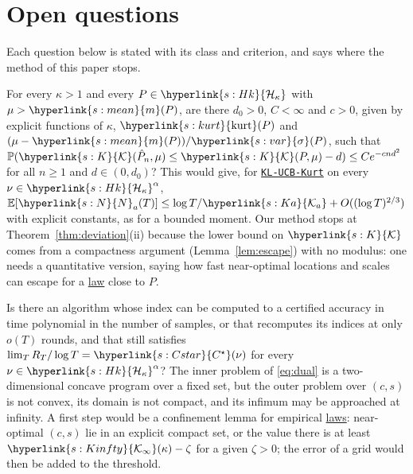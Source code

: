 \documentclass[11pt]{article}
\newcommand{\E}{\mathbb{E}}
\newcommand{\Prob}{\mathbb{P}}
\newcommand{\sy}[2]{{\hyperlink{#1}{#2}}}
\newcommand{\term}[2]{\hyperlink{#1}{#2}}
\newcommand{\mean}{\sy{s:mean}{m}}
\newcommand{\sd}{\sy{s:var}{\sigma}}
\newcommand{\kurt}{\sy{s:kurt}{\mathrm{kurt}}}
\newcommand{\Hk}{\sy{s:Hk}{\mathcal{H}_{\kappa}}}
\newcommand{\Kc}{\sy{s:K}{\mathcal{K}}}
\newcommand{\Kinfty}{\sy{s:Kinfty}{\mathcal{K}_{\infty}}}
\newcommand{\Np}{\sy{s:N}{N}}
\newcommand{\Cst}{\sy{s:Cstar}{C^{\star}}}
\newcommand{\Ka}{\sy{s:Ka}{\mathcal{K}_{a}}}
\newcommand{\algo}{\hyperref[alg:kucb]{\texttt{KL-UCB-Kurt}}}
\begin{document}
\section{Open questions}\label{sec:open}

Each question below is stated with its class and criterion, and says where the method of this paper stops.

\begin{openquestion}\label{oq:finite}
For every $\kappa>1$ and every $P\in\Hk$ with $\mu>\mean(P)$, are there $d_0>0$, $C<\infty$ and $c>0$, given by explicit
functions of $\kappa$, $\kurt(P)$ and $(\mu-\mean(P))/\sd(P)$, such that
$\Prob(\Kc(\hat P_n,\mu)\le\Kc(P,\mu)-d)\le Ce^{-cnd^2}$ for all $n\ge1$ and $d\in(0,d_0)$? This would give, for \algo{} on every
$\nu\in\Hk^\alpha$, $\E[\Np_a(T)]\le\log T/\Ka+O((\log T)^{2/3})$ with explicit constants, as \citet[Theorem~1]{AJK21} for a bounded
moment. Our method stops at Theorem~\ref{thm:deviation}(ii) because the lower bound on $\Kc$ comes from a
compactness argument (Lemma~\ref{lem:escape}) with no modulus: one needs a quantitative version, saying how
fast near-optimal locations and scales can escape for a \term{w:law}{law} close to $P$.
\end{openquestion}

\begin{openquestion}\label{oq:computation}
Is there an algorithm whose index can be computed to a certified accuracy in time polynomial in the number of
samples, or that recomputes its indices at only $o(T)$ rounds, and that still satisfies
$\lim_TR_T/\log T=\Cst(\nu)$ for every $\nu\in\Hk^\alpha$? The inner problem of \eqref{eq:dual} is a two-dimensional concave
program over a fixed set, but the outer problem over $(c,s)$ is not convex, its domain is not compact, and its
infimum may be approached at infinity. A first step would be a confinement lemma for empirical \term{w:law}{laws}: near-optimal
$(c,s)$ lie in an explicit compact set, or the value there is at least $\Kinfty(\kappa)-\zeta$ for a given $\zeta>0$; the error of a grid would then
be added to the threshold.
\end{openquestion}
\end{document}
